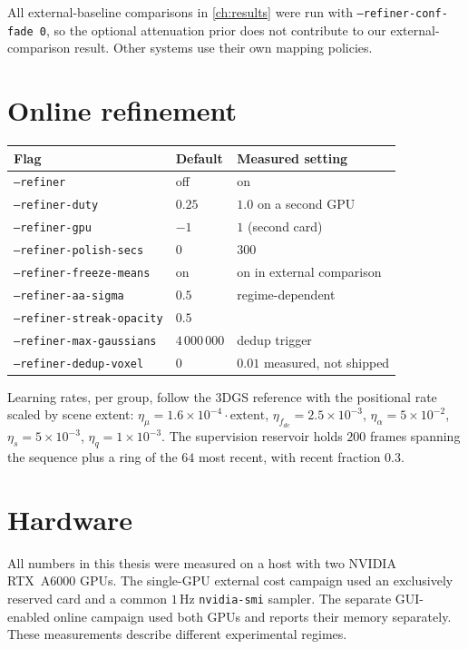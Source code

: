 All external-baseline comparisons in \cref{ch:results} were run with
\texttt{--refiner-conf-fade 0}, so the optional attenuation prior does not
contribute to our external-comparison result. Other systems use their own
mapping policies.

\section{Online refinement}

\begin{center}
\begin{tabular}{@{}lll@{}}
\toprule
Flag & Default & Measured setting \\
\midrule
\texttt{--refiner}              & off      & on \\
\texttt{--refiner-duty}         & $0.25$   & $1.0$ on a second GPU \\
\texttt{--refiner-gpu}          & $-1$     & $1$ (second card) \\
\texttt{--refiner-polish-secs}  & $0$      & $300$ \\
\texttt{--refiner-freeze-means} & on       & on in external comparison \\
\texttt{--refiner-aa-sigma}     & $0.5$    & regime-dependent \\
\texttt{--refiner-streak-opacity} & $0.5$  & \\
\texttt{--refiner-max-gaussians}& $4\,000\,000$ & dedup trigger \\
\texttt{--refiner-dedup-voxel}  & $0$      & $0.01$ measured, not shipped \\
\bottomrule
\end{tabular}
\end{center}

Learning rates, per group, follow the 3DGS reference with the positional rate
scaled by scene extent:
$\eta_\mu = 1.6\!\times\!10^{-4}\!\cdot\!\mathrm{extent}$,
$\eta_{f_{dc}} = 2.5\!\times\!10^{-3}$,
$\eta_\alpha = 5\!\times\!10^{-2}$,
$\eta_s = 5\!\times\!10^{-3}$,
$\eta_q = 1\!\times\!10^{-3}$.
The supervision reservoir holds $200$ frames spanning the sequence plus a ring
of the $64$ most recent, with recent fraction $0.3$.

\section{Hardware}

All numbers in this thesis were measured on a host with two NVIDIA RTX~A6000
GPUs. The single-GPU external cost campaign used an exclusively reserved
card and a common $1$\,Hz \texttt{nvidia-smi} sampler. The separate
GUI-enabled online campaign used both GPUs and reports their memory
separately. These measurements describe different experimental regimes.
